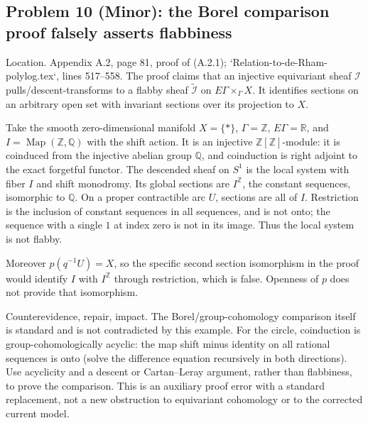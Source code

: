 \documentclass[10pt]{article}
\begin{document}
\subsection*{Problem 10 (Minor): the Borel comparison proof falsely asserts flabbiness}
Location. Appendix A.2, page 81, proof of (A.2.1); `Relation-to-de-Rham-polylog.tex`, lines 517–558. The proof claims that an injective equivariant sheaf \(\mathcal I\) pulls/descent-transforms to a flabby sheaf \(\widetilde{\mathcal I}\) on \(E\Gamma\times_\Gamma X\). It identifies sections on an arbitrary open set with invariant sections over its projection to \(X\).\par
Take the smooth zero-dimensional manifold \(X=\{\ast\}\), \(\Gamma=\mathbb Z\), \(E\Gamma=\mathbb R\), and \(I=\operatorname{Map}(\mathbb Z,\mathbb Q)\) with the shift action. It is an injective \(\mathbb Z[\mathbb Z]\)-module: it is coinduced from the injective abelian group \(\mathbb Q\), and coinduction is right adjoint to the exact forgetful functor. The descended sheaf on \(S^1\) is the local system with fiber \(I\) and shift monodromy. Its global sections are \(I^\mathbb Z\), the constant sequences, isomorphic to \(\mathbb Q\). On a proper contractible arc \(U\), sections are all of \(I\). Restriction is the inclusion of constant sequences in all sequences, and is not onto; the sequence with a single \(1\) at index zero is not in its image. Thus the local system is not flabby.\par
Moreover \(p(q^{-1}U)=X\), so the specific second section isomorphism in the proof would identify \(I\) with \(I^\mathbb Z\) through restriction, which is false. Openness of \(p\) does not provide that isomorphism.\par
Counterevidence, repair, impact. The Borel/group-cohomology comparison itself is standard and is not contradicted by this example. For the circle, coinduction is group-cohomologically acyclic: the map shift minus identity on all rational sequences is onto (solve the difference equation recursively in both directions). Use acyclicity and a descent or Cartan–Leray argument, rather than flabbiness, to prove the comparison. This is an auxiliary proof error with a standard replacement, not a new obstruction to equivariant cohomology or to the corrected current model.\par
\end{document}

